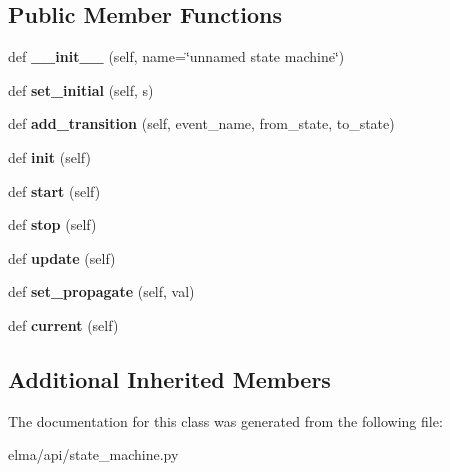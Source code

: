 \subsection*{Public Member Functions}
\begin{DoxyCompactItemize}
\item 
\mbox{\label{classelma_1_1api_1_1state__machine_1_1StateMachine_ac78c9f7d441428da577f56575950df32}} 
def {\bfseries \+\_\+\+\_\+init\+\_\+\+\_\+} (self, name=\char`\"{}unnamed state machine\char`\"{})
\item 
\mbox{\label{classelma_1_1api_1_1state__machine_1_1StateMachine_a811156049fbd4acfd8104b2d83506d3a}} 
def {\bfseries set\+\_\+initial} (self, s)
\item 
\mbox{\label{classelma_1_1api_1_1state__machine_1_1StateMachine_adfb788d612f7453935d09bc39d87aa3d}} 
def {\bfseries add\+\_\+transition} (self, event\+\_\+name, from\+\_\+state, to\+\_\+state)
\item 
\mbox{\label{classelma_1_1api_1_1state__machine_1_1StateMachine_afe81dcfc4462c855a95d0088da346f77}} 
def {\bfseries init} (self)
\item 
\mbox{\label{classelma_1_1api_1_1state__machine_1_1StateMachine_aa41df28621b1c1bff35a22f4e546468d}} 
def {\bfseries start} (self)
\item 
\mbox{\label{classelma_1_1api_1_1state__machine_1_1StateMachine_ae06fd2e258a724100a32c1a2a515a415}} 
def {\bfseries stop} (self)
\item 
\mbox{\label{classelma_1_1api_1_1state__machine_1_1StateMachine_a09377453c82f6a20fa74e5b6196bbcf7}} 
def {\bfseries update} (self)
\item 
\mbox{\label{classelma_1_1api_1_1state__machine_1_1StateMachine_a33e5740993b92f934277ba3301854e1e}} 
def {\bfseries set\+\_\+propagate} (self, val)
\item 
\mbox{\label{classelma_1_1api_1_1state__machine_1_1StateMachine_a2901d43df138803f6763c96823369242}} 
def {\bfseries current} (self)
\end{DoxyCompactItemize}
\subsection*{Additional Inherited Members}


The documentation for this class was generated from the following file\+:\begin{DoxyCompactItemize}
\item 
elma/api/state\+\_\+machine.\+py\end{DoxyCompactItemize}
